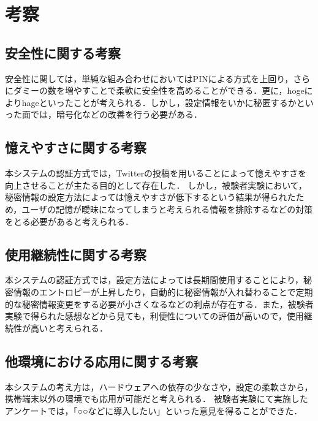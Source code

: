 \chapter{考察}\label{chap:discussion}

\section{安全性に関する考察}\label{sec:safety}
安全性に関しては，単純な組み合わせにおいてはPINによる方式を上回り，さらにダミーの数を増やすことで柔軟に安全性を高めることができる．更に，hogeによりhageといったことが考えられる．しかし，設定情報をいかに秘匿するかといった面では，暗号化などの改善を行う必要がある．

\section{憶えやすさに関する考察}\label{sec:memorable}
本システムの認証方式では，Twitterの投稿を用いることによって憶えやすさを向上させることが主たる目的として存在した．
しかし，被験者実験において，秘密情報の設定方法によっては憶えやすさが低下するという結果が得られたため，ユーザの記憶が曖昧になってしまうと考えられる情報を排除するなどの対策をとる必要があると考えられる．

\section{使用継続性に関する考察}\label{sec:continuity}
本システムの認証方式では，設定方法によっては長期間使用することにより，秘密情報のエントロピーが上昇したり，自動的に秘密情報が入れ替わることで定期的な秘密情報変更をする必要が小さくなるなどの利点が存在する．また，被験者実験で得られた感想などから見ても，利便性についての評価が高いので，使用継続性が高いと考えられる．

\section{他環境における応用に関する考察}\label{sec:application}
本システムの考え方は，ハードウェアへの依存の少なさや，設定の柔軟さから，携帯端末以外の環境でも応用が可能だと考えられる．
被験者実験にて実施したアンケートでは，「○○などに導入したい」といった意見を得ることができた．

\newpage

